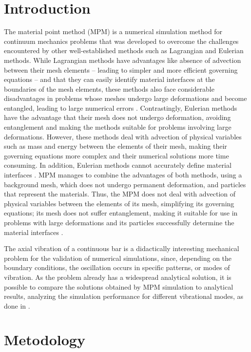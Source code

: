 \documentclass[preprint,12pt]{elsarticle}
\begin{document}
\section{Introduction}
\label{Introduction}
The material point method (MPM) is a numerical simulation method for continuum mechanics problems that was developed to overcome the challenges encountered by other well-established methods such as Lagrangian and Eulerian methods. While Lagrangian methods have advantages like absence of advection between their mesh elements – leading to simpler and more efficient governing equations – and that they can easily identify material interfaces at the boundaries of the mesh elements, these methods also face considerable disadvantages in problems whose meshes undergo large deformations and become entangled, leading to large numerical errors \cite{Zhang2017}. Contrastingly, Eulerian methods have the advantage that their mesh does not undergo deformation, avoiding entanglement and making the methods suitable for problems involving large deformations. However, these methods deal with advection of physical variables such as mass and energy between the elements of their mesh, making their governing equations more complex and their numerical solutions more time consuming. In addition, Eulerian methods cannot accurately define material interfaces \cite{Zhang2017,Fern2019}. MPM manages to combine the advantages of both methods, using a background mesh, which does not undergo permanent deformation, and particles that represent the materials. Thus, the MPM does not deal with advection of physical variables between the elements of its mesh, simplifying its governing equations; its mesh does not suffer entanglement, making it suitable for use in problems with large deformations and its particles successfully determine the material interfaces \cite{Fern2019}.

The axial vibration of a continuous bar is a didactically interesting mechanical problem for the validation of numerical simulations, since, depending on the boundary conditions, the oscillation occurs in specific patterns, or modes of vibration. As the problem already has a widespread analytical solution, it is possible to compare the solutions obtained by MPM simulation to analytical results, analyzing the simulation performance for different vibrational modes, as done in \cite{Bardenhagen2002}.

\section{Metodology}
\label{Metodology}
\end{document}

